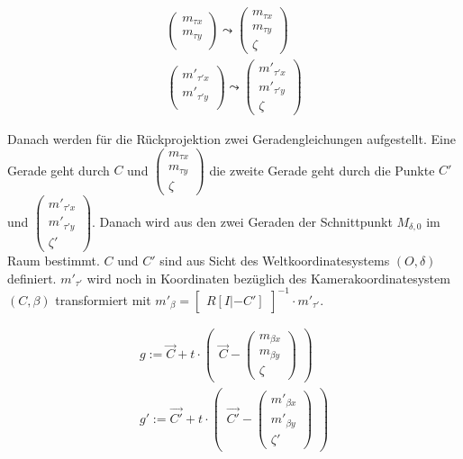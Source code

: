 \begin{gather}
	\begin{pmatrix}
	m_{\tau x}\\
	m_{\tau y}\\
	\end{pmatrix} \leadsto 
		\begin{pmatrix}
	m_{\tau x} \\
	m_{\tau y}\\
	\zeta
	\end{pmatrix}\\
		\begin{pmatrix}
	m'_{\tau' x}\\
	m'_{\tau' y}\\
	\end{pmatrix} \leadsto 
	\begin{pmatrix}
	m'_{\tau' x} \\
	m'_{\tau' y}\\
	\zeta
	\end{pmatrix}	
\end{gather}

Danach werden für die Rückprojektion zwei Geradengleichungen aufgestellt. Eine Gerade geht durch $C$ und $	\begin{pmatrix}
m_{\tau x} \\
m_{\tau y}\\
\zeta
\end{pmatrix} $ die zweite Gerade geht durch die Punkte $C'$ und $	\begin{pmatrix}
m'_{\tau' x} \\
m'_{\tau' y}\\
\zeta'
\end{pmatrix}$. Danach wird aus den zwei Geraden der Schnittpunkt $M_{\delta,0}$ im Raum bestimmt. $C$ und $C'$ sind aus Sicht des Weltkoordinatesystems $(O,\delta)$ definiert. $m'_{\tau'}$ wird noch in Koordinaten bezüglich des Kamerakoordinatesystem $(C,\beta)$ transformiert mit $m'_\beta = \begin{bmatrix}
R[I|-C']
\end{bmatrix}^{-1} \cdot m'_{\tau'}$.



\begin{gather}
	 g:= \vec{C} + t \cdot 
	\begin{pmatrix}
	 	\vec{C} -	
	\begin{pmatrix}	
	m_{\beta x} \\
	m_{\beta y}\\
	\zeta
	\end{pmatrix}
 \end{pmatrix} \\
g' := \vec{C'} + t \cdot 
\begin{pmatrix}
	\vec{C'} -
	\begin{pmatrix}
	m'_{\beta x} \\
	m'_{\beta y}\\
	\zeta'
	\end{pmatrix}
\end{pmatrix}
\end{gather}


